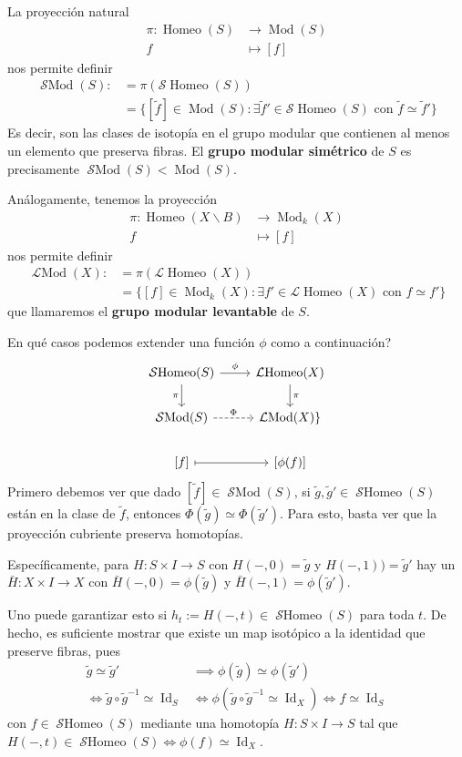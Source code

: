 \documentclass[spanish]{article}
\theoremstyle{definition}
\DeclareMathOperator{\Id}{Id}
\DeclareMathOperator{\Mod}{Mod}
\DeclareMathOperator{\Homeo}{Homeo}
\DeclareMathOperator{\SMod}{\mathcal{S}Mod}
\DeclareMathOperator{\LMod}{\mathcal{L}Mod}
\DeclareMathOperator{\SHomeo}{\mathcal{S}Homeo}
\DeclareMathOperator{\LHomeo}{\mathcal{L}Homeo}
\begin{document}
	La proyección natural
	\begin{align*}
		\pi:\Homeo(S)&\to\Mod(S)\\
		f&\mapsto [f]
	\end{align*}
	nos permite definir
	\begin{align*}
		\SMod(S):&=\pi(\mathcal{S}\Homeo(S))\\
		&=\{[\tilde{f}]\in\Mod(S):\exists\tilde{f}'\in\mathcal{S}\Homeo(S)\text{ con }\tilde{f}\simeq\tilde{f}'\}
	\end{align*}
	Es decir, son las clases de isotopía en el grupo modular que contienen al menos un elemento que preserva fibras. El \textbf{grupo modular simétrico} de $S$ es precisamente $\SMod(S)<\Mod(S)$.
	
	Análogamente, tenemos la proyección
\begin{align*}
	\pi:\Homeo(X\backslash B)&\to\Mod_k(X)\\
	f&\mapsto [f]
\end{align*}
nos permite definir
\begin{align*}
	\LMod(X):&=\pi(\mathcal{L}\Homeo(X))\\
	&=\{[f]\in\Mod_k(X):\exists f'\in\mathcal{L}\Homeo(X)\text{ con }f\simeq f'\}
\end{align*}
que llamaremos el \textbf{grupo modular levantable} de $S$.

En qué casos podemos extender una función $\phi$ como a continuación?
\[\begin{tikzcd}
	\SHomeo(S)\arrow[r,"\phi"]\arrow[d,"\pi",swap]&\LHomeo(X)\arrow[d,"\pi"]\\
	\SMod(S)\arrow[dashed,r,"\Phi"]&\LMod(X)\}\\
	\left[f\right]\arrow[maps to]{r}&\left[\phi(f)\right]
\end{tikzcd}\]
Primero debemos ver que dado $[\tilde{f}]\in\SMod(S)$, si $\tilde{g},\tilde{g}'\in\SHomeo(S)$ están en la clase de $\tilde{f}$, entonces $\Phi(\tilde{g})\simeq\Phi(\tilde{g}')$. Para esto, basta ver que la proyección cubriente preserva homotopías.

Específicamente, para $H:S\times I\to S$ con $H(-,0)=\tilde{g}$ y $H(-,1))=\tilde{g}'$ hay un $\bar{H}:X\times I\to X$ con $\bar{H}(-,0)=\phi(\tilde{g})$ y $\bar{H}(-,1)=\phi(\tilde{g}')$.

Uno puede garantizar esto si $h_t:=H(-,t)\in\SHomeo(S)$ para toda $t$. De hecho, es suficiente mostrar que existe un map isotópico a la identidad que preserve fibras, pues
\begin{align*}
	\tilde{g}\simeq\tilde{g}'&\implies\phi(\tilde{g})\simeq\phi(\tilde{g}')\\
	\iff\tilde{g}\circ\tilde{g}^{-1}\simeq\Id_S&\iff\phi(\tilde{g}\circ\tilde{g}^{-1}\simeq\Id_X)\iff f\simeq\Id_S
\end{align*}
con $f\in\SHomeo(S)$ mediante una homotopía $H:S\times I\to S$ tal que $H(-,t)\in\SHomeo(S)\iff\phi(f)\simeq\Id_X$.
\end{document}
